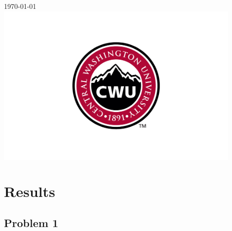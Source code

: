 \documentclass[12pt]{article}
\begin{document}
\begin{titlepage}
		
		
		{\large \today}\\ %
		
		
		\includegraphics[width=12cm]{CWU-Logo.png}\\[.5cm] %
		
		
		\vfill %
		
	\end{titlepage}
	\newpage
	\tableofcontents
	\newpage
	
	
	
	\section{Results}
		\subsection{Problem 1}
\end{document}
